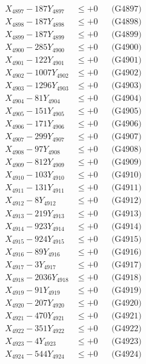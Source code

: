 \documentclass[a4paper,10pt]{article}
\begin{document}
{\begin{align}
X_{4897} - 187Y_{4897} &\leq +0 && \text{(G4897)} \\
X_{4898} - 187Y_{4898} &\leq +0 && \text{(G4898)} \\
X_{4899} - 187Y_{4899} &\leq +0 && \text{(G4899)} \\
X_{4900} - 285Y_{4900} &\leq +0 && \text{(G4900)} \\
\allowbreak
X_{4901} - 122Y_{4901} &\leq +0 && \text{(G4901)} \\
X_{4902} - 1007Y_{4902} &\leq +0 && \text{(G4902)} \\
X_{4903} - 1296Y_{4903} &\leq +0 && \text{(G4903)} \\
X_{4904} - 81Y_{4904} &\leq +0 && \text{(G4904)} \\
X_{4905} - 151Y_{4905} &\leq +0 && \text{(G4905)} \\
X_{4906} - 171Y_{4906} &\leq +0 && \text{(G4906)} \\
X_{4907} - 299Y_{4907} &\leq +0 && \text{(G4907)} \\
X_{4908} - 97Y_{4908} &\leq +0 && \text{(G4908)} \\
X_{4909} - 812Y_{4909} &\leq +0 && \text{(G4909)} \\
X_{4910} - 103Y_{4910} &\leq +0 && \text{(G4910)} \\
\allowbreak
X_{4911} - 131Y_{4911} &\leq +0 && \text{(G4911)} \\
X_{4912} - 8Y_{4912} &\leq +0 && \text{(G4912)} \\
X_{4913} - 219Y_{4913} &\leq +0 && \text{(G4913)} \\
X_{4914} - 923Y_{4914} &\leq +0 && \text{(G4914)} \\
X_{4915} - 924Y_{4915} &\leq +0 && \text{(G4915)} \\
X_{4916} - 89Y_{4916} &\leq +0 && \text{(G4916)} \\
X_{4917} - 3Y_{4917} &\leq +0 && \text{(G4917)} \\
X_{4918} - 2036Y_{4918} &\leq +0 && \text{(G4918)} \\
X_{4919} - 91Y_{4919} &\leq +0 && \text{(G4919)} \\
X_{4920} - 207Y_{4920} &\leq +0 && \text{(G4920)} \\
\allowbreak
X_{4921} - 470Y_{4921} &\leq +0 && \text{(G4921)} \\
X_{4922} - 351Y_{4922} &\leq +0 && \text{(G4922)} \\
X_{4923} - 4Y_{4923} &\leq +0 && \text{(G4923)} \\
X_{4924} - 544Y_{4924} &\leq +0 && \text{(G4924)} \\

\end{align}}
\end{document}
